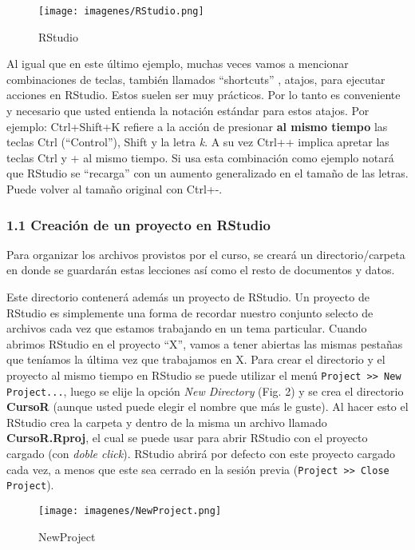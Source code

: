 \documentclass[]{article}
\makeatletter
\def\maxwidth{\ifdim\Gin@nat@width>\linewidth\linewidth
\else\Gin@nat@width\fi}
\let\Oldincludegraphics\includegraphics
\renewcommand{\includegraphics}[1]{\Oldincludegraphics[width=\maxwidth]{#1}}
\makeatother
\begin{document}
\begin{figure}[htbp]
\centering
\texttt{[image: imagenes/RStudio.png]}
\caption{RStudio}
\end{figure}

Al igual que en este último ejemplo, muchas veces vamos a mencionar
combinaciones de teclas, también llamados ``shortcuts'' , atajos, para
ejecutar acciones en RStudio. Estos suelen ser muy prácticos. Por lo
tanto es conveniente y necesario que usted entienda la notación estándar
para estos atajos. Por ejemplo: Ctrl+Shift+K refiere a la acción de
presionar \textbf{al mismo tiempo} las teclas Ctrl (``Control''), Shift
y la letra \emph{k}. A su vez Ctrl++ implica apretar las teclas Ctrl y +
al mismo tiempo. Si usa esta combinación como ejemplo notará que RStudio
se ``recarga'' con un aumento generalizado en el tamaño de las letras.
Puede volver al tamaño original con Ctrl+-.

\subsubsection{1.1 Creación de un proyecto en RStudio}

Para organizar los archivos provistos por el curso, se creará un
directorio/carpeta en donde se guardarán estas lecciones así como el
resto de documentos y datos.

Este directorio contenerá además un proyecto de RStudio. Un proyecto de
RStudio es simplemente una forma de recordar nuestro conjunto selecto de
archivos cada vez que estamos trabajando en un tema particular. Cuando
abrimos RStudio en el proyecto ``X'', vamos a tener abiertas las mismas
pestañas que teníamos la última vez que trabajamos en X. Para crear el
directorio y el proyecto al mismo tiempo en RStudio se puede utilizar el
menú \texttt{Project \textgreater{}\textgreater{} New Project...}, luego
se elije la opción \emph{New Directory} (Fig. 2) y se crea el directorio
\textbf{CursoR} (aunque usted puede elegir el nombre que más le guste).
Al hacer esto el RStudio crea la carpeta y dentro de la misma un archivo
llamado \textbf{CursoR.Rproj}, el cual se puede usar para abrir RStudio
con el proyecto cargado (con \emph{doble click}). RStudio abrirá por
defecto con este proyecto cargado cada vez, a menos que este sea cerrado
en la sesión previa
(\texttt{Project \textgreater{}\textgreater{} Close Project}).

\begin{figure}[htbp]
\centering
\texttt{[image: imagenes/NewProject.png]}
\caption{NewProject}
\end{figure}
\end{document}
